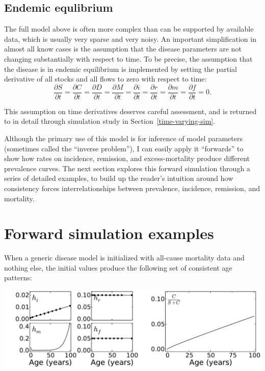 \subsection{Endemic equlibrium}
\label{theory-forward_sim-compartmental_model-simplying_assumptions}

The full model above is often more complex than can be supported by
available data, which is usually very sparse and very noisy.  An
important simplification in almost all know cases is the assumption
that the disease parameters are not changing substantially with
respect to time. To be precise, the assumption that the disease is in
endemic equilibrium is implemented by setting the partial derivative
of all stocks and all flows to zero with respect to time:
\[
\frac{\partial S}{\partial t}
=
\frac{\partial C}{\partial t}
=
\frac{\partial D}{\partial t}
=
\frac{\partial M}{\partial t}
=
\frac{\partial i}{\partial t}
=
\frac{\partial r}{\partial t}
=
\frac{\partial m}{\partial t}
=
\frac{\partial f}{\partial t}
=
0.
\]

This assumption on time derivatives deserves careful assessment, and
is returned to in detail through simulation study in
Section~\ref{time-varying-sim}.

Although the primary use of this model is for inference of model
parameters (sometimes called the ``inverse problem''), I can easily
apply it ``forwards'' to show how rates on incidence, remission, and
excess-mortality produce different prevalence curves. The next section
explores this forward simulation through a series of detailed
examples, to build up the reader's intuition around how consistency
forces interrelationships between prevalence, incidence, remission,
and mortality.


\section{Forward simulation examples}

When a generic disease model is initialized with all-cause mortality
data and nothing else, the initial values produce the following set of
consistent age patterns:

\includegraphics[width=\textwidth]{initial.pdf}

